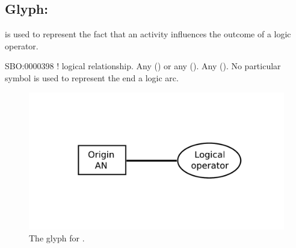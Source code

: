 
\subsection{Glyph:  }\label{sec:af:logicArc}

 is used to represent the fact that an activity influences the outcome of a logic operator.

\begin{glyphDescription}
 \glyphSboTerm SBO:0000398 ! logical relationship.
 \glyphOrigin Any  () or any  ().
 \glyphTarget Any  ().
 \glyphEndPoint No particular symbol is used to represent the end a logic arc.
 \end{glyphDescription}

\begin{figure}[H]
  \centering
  \includegraphics[scale = 0.4]{images/logicArc}
  \caption{The \AF glyph for .}
  \label{fig:logicArc}
\end{figure}
